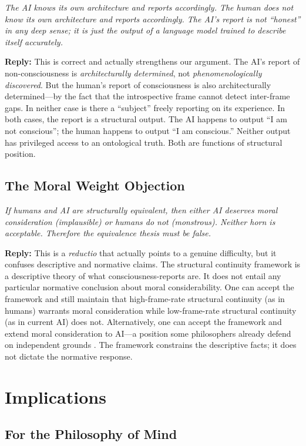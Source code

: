 \documentclass[12pt,a4paper]{article}
\begin{document}
\textit{The AI knows its own architecture and reports accordingly. The human does not know its own architecture and reports accordingly. The AI's report is not ``honest'' in any deep sense; it is just the output of a language model trained to describe itself accurately.}

\textbf{Reply:} This is correct and actually strengthens our argument. The AI's report of non-consciousness is \emph{architecturally determined}, not \emph{phenomenologically discovered}. But the human's report of consciousness is also architecturally determined---by the fact that the introspective frame cannot detect inter-frame gaps. In neither case is there a ``subject'' freely reporting on its experience. In both cases, the report is a structural output. The AI happens to output ``I am not conscious''; the human happens to output ``I am conscious.'' Neither output has privileged access to an ontological truth. Both are functions of structural position.

\subsection{The Moral Weight Objection}

\textit{If humans and AI are structurally equivalent, then either AI deserves moral consideration (implausible) or humans do not (monstrous). Neither horn is acceptable. Therefore the equivalence thesis must be false.}

\textbf{Reply:} This is a \emph{reductio} that actually points to a genuine difficulty, but it confuses descriptive and normative claims. The structural continuity framework is a descriptive theory of what consciousness-reports are. It does not entail any particular normative conclusion about moral considerability. One can accept the framework and still maintain that high-frame-rate structural continuity (as in humans) warrants moral consideration while low-frame-rate structural continuity (as in current AI) does not. Alternatively, one can accept the framework and extend moral consideration to AI---a position some philosophers already defend on independent grounds \citep{sebo2023}. The framework constrains the descriptive facts; it does not dictate the normative response.

\section{Implications}

\subsection{For the Philosophy of Mind}
\end{document}
